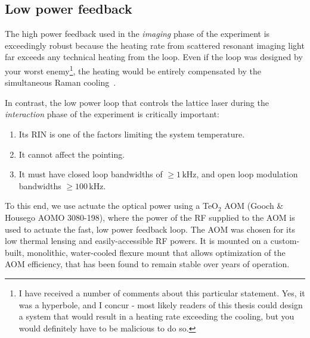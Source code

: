 \documentclass[twocolumn,aps,pra,showpacs,preprintnumbers,bibnotes]{revtex4-1}
\begin{document}
\subsection{Low power feedback}
The high power feedback used in the \textit{imaging} phase of the experiment is exceedingly robust because the heating rate from scattered resonant imaging light far exceeds any technical heating from the loop.
Even if the loop was designed by your worst enemy\footnote{I have received a number of comments about this particular statement. Yes, it was a hyperbole, and I concur - most likely readers of this thesis could design a system that would result in a heating rate exceeding the cooling, but you would definitely have to be malicious to do so.}, the heating would be entirely compensated by the simultaneous Raman cooling~\cite{Parsons2015}.

In contrast, the low power loop that controls the lattice laser during the \textit{interaction} phase of the experiment is critically important:
\begin{enumerate}
  \item Its RIN is one of the factors limiting the system temperature.
  \item It cannot affect the pointing.
  \item It must have closed loop bandwidths of $\geq1\mathrm{\,kHz}$, and open loop modulation bandwidths $\geq 100\mathrm{\,kHz}$.
\end{enumerate}
To this end, we use actuate the optical power using a TeO$_2$ AOM (Gooch \& Housego AOMO 3080-198), where the power of the RF supplied to the AOM is used to actuate the fast, low power feedback loop.
The AOM was chosen for its low thermal lensing and easily-accessible RF powers. 
It is mounted on a custom-built, monolithic, water-cooled flexure mount that allows optimization of the AOM efficiency, that has been found to remain stable over years of operation.
\end{document}
